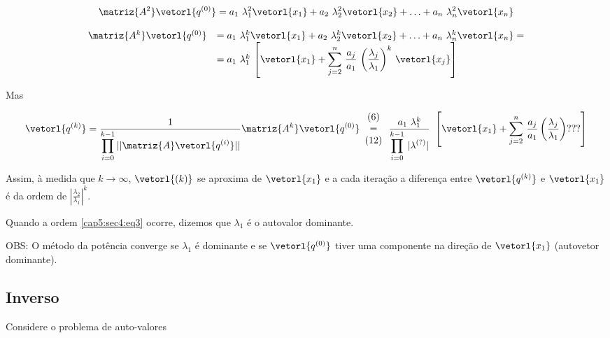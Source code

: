 \begin{equation}
 \label{cap5:sec4:eq11}
 \matriz{A^2} \vetorl{q^{(0)}} = a_1 \, \, \lambda_1^2 \vetorl{x_1} + a_2 \, \, \lambda_2^2 \vetorl{x_2} + \ldots + a_n \, \, \lambda_n^2 \vetorl{x_n}
\end{equation}

\begin{equation}
 \label{cap5:sec4:eq12}
 \begin{array}{ll}
 \matriz{A^k} \vetorl{q^{(0)}} & = a_1  \,\, \lambda_1^k \vetorl{x_1} + a_2 \, \, \lambda_2^k \vetorl{x_2} + \ldots + a_n \, \, \lambda_n^k \vetorl{x_n} =\\
                               & = a_1 \, \, \lambda_1^k \, \left[\vetorl{x_1} + \displaystyle \sum^n_{j=2} \, \frac{a_j}{a_1} \, \left(\frac{\lambda_j}{\lambda_1}\right)^k \, \vetorl{x_j}\right]
 \end{array}
\end{equation}

Mas

\begin{equation}
 \vetorl{q^{(k)}} = \frac{1}{\displaystyle \prod_{i=0}^{k-1} || \matriz{A} \vetorl{q^{(i)}} ||} \matriz{A^k} \vetorl{q^{(0)}}
 \begin{array}{c}
  (6)\\
  =\\
  (12)
 \end{array}
 \, \frac{a_1 \, \, \lambda_1^k}{\displaystyle \prod_{i=0}^{k-1} \, | \lambda^{(?)} |} \, \,
 \left[\vetorl{x_1} + \sum_{j=2}^n \, \frac{a_j}{a_1} \left(\frac{\lambda_j}{\lambda_1}\right) ??? \right]
\end{equation}

Assim, à medida que $ k \rightarrow \infty $, $ \vetorl{(k)} $ se aproxima de $ \vetorl{x_1} $ e a cada iteração a diferença entre $ \vetorl{q^{(k)}} $ e $ \vetorl{x_1} $ é da ordem de $ \left| \displaystyle \frac{\lambda_2}{\lambda_1} \right|^k $.

Quando a ordem \ref{cap5:sec4:eq3} ocorre, dizemos que $ \lambda_1 $ é o autovalor dominante.

OBS: O método da potência converge se $ \lambda_1 $ é dominante e se $ \vetorl{q^{(0)}} $ tiver uma componente na direção de $ \vetorl{x_1} $ (autovetor dominante).

\subsection{Inverso}

Considere o problema de auto-valores

